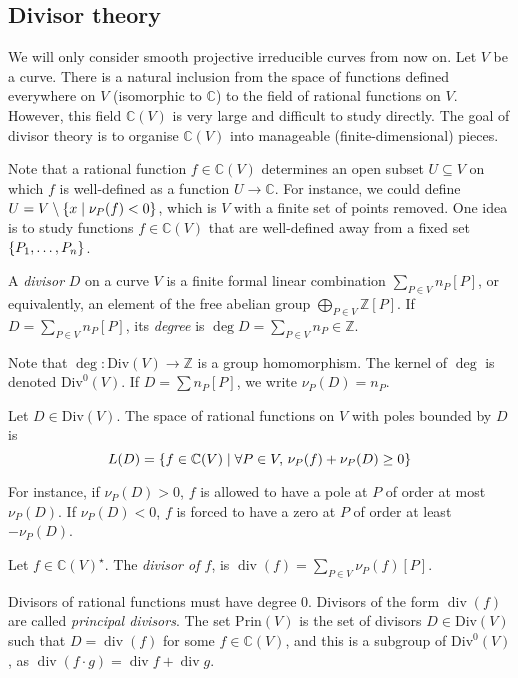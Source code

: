 \subsection{Divisor theory}
We will only consider smooth projective irreducible curves from now on.
Let \( V \) be a curve.
There is a natural inclusion from the space of functions defined everywhere on \( V \) (isomorphic to \( \mathbb C \)) to the field of rational functions on \( V \).
However, this field \( \mathbb C(V) \) is very large and difficult to study directly.
The goal of divisor theory is to organise \( \mathbb C(V) \) into manageable (finite-dimensional) pieces.

Note that a rational function \( f \in \mathbb C(V) \) determines an open subset \( U \subseteq V \) on which \( f \) is well-defined as a function \( U \to \mathbb C \).
For instance, we could define \( U = V \setminus \qty{x \mid \nu_P(f) < 0} \), which is \( V \) with a finite set of points removed.
One idea is to study functions \( f \in \mathbb C(V) \) that are well-defined away from a fixed set \( \qty{P_1, \dots, P_n} \).
\begin{definition}
    A \emph{divisor} \( D \) on a curve \( V \) is a finite formal linear combination \( \sum_{P \in V} n_P[P] \), or equivalently, an element of the free abelian group \( \bigoplus_{P \in V} \mathbb Z[P] \).
    If \( D = \sum_{P \in V} n_P [P] \), its \emph{degree} is \( \deg D = \sum_{P \in V} n_P \in \mathbb Z \).
\end{definition}
Note that \( \deg \colon \mathrm{Div}(V) \to \mathbb Z \) is a group homomorphism.
The kernel of \( \deg \) is denoted \( \mathrm{Div}^0(V) \).
If \( D = \sum n_P [P] \), we write \( \nu_P(D) = n_P \).
\begin{definition}
    Let \( D \in \mathrm{Div}(V) \).
    The space of rational functions on \( V \) with poles bounded by \( D \) is
    \[ L(D) = \qty{f \in \mathbb C(V) \mid \forall P \in V,\, \nu_P(f) + \nu_P(D) \geq 0} \]
\end{definition}
For instance, if \( \nu_P(D) > 0 \), \( f \) is allowed to have a pole at \( P \) of order at most \( \nu_P(D) \).
If \( \nu_P(D) < 0 \), \( f \) is forced to have a zero at \( P \) of order at least \( -\nu_P(D) \).
\begin{definition}
    Let \( f \in \mathbb C(V)^\star \).
    The \emph{divisor of \( f \)}, is \( \operatorname{div}(f) = \sum_{P \in V} \nu_P(f)[P] \).
\end{definition}
Divisors of rational functions must have degree 0.
Divisors of the form \( \operatorname{div}(f) \) are called \emph{principal divisors}.
The set \( \mathrm{Prin}(V) \) is the set of divisors \( D \in \mathrm{Div}(V) \) such that \( D = \operatorname{div}(f) \) for some \( f \in \mathbb C(V) \), and this is a subgroup of \( \mathrm{Div}^0(V) \), as \( \operatorname{div}(f \cdot g) = \operatorname{div}f + \operatorname{div}g \).

